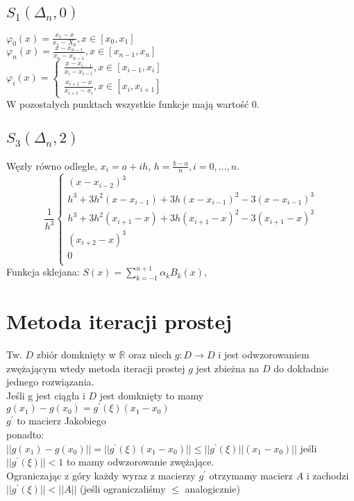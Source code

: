 \documentclass[twocolumn]{article}
\begin{document}
\begin{flushleft}
\subsection{$S_1(\Delta_n, 0)$}
$\varphi_0(x) = \frac{x_1-x}{x_1-X_0}, x \in [x_0, x_1]$\\
$\varphi_n(x) = \frac{x-x_{n-1}}{x_n - x_{n-1}}, x \in [x_{n-1}, x_n]$\\
$\varphi_i(x) =\begin{cases} \frac{x-x_{i-1}}{x_i - x_{i-1}}, x \in [x_{i-1}, x_i]\\ \frac{x_{i+1}-x}{x_{i+1} - x_i}, x \in [x_i, x_{i+1}]\end{cases}$ \\
W pozostałych punktach wszystkie funkcje mają wartość 0.\\
\subsection{$S_3(\Delta_n, 2)$}
Węzły równo odległe, $x_i = a+ih$, $h=\frac{b-a}{n}, i =0,...,n$.\\
$$
\frac{1}{h^3}\begin{cases}
(x - x_{i-2})^3 \\%
h^3 + 3h^2(x - x_{i-1}) + 3h(x - x_{i-1})^2 - 3(x - x_{i-1})^3 \\%
h^3 + 3h^2(x_{i+1} - x) + 3h(x_{i+1} - x)^2 - 3(x_{i+1} - x)^3\\%
(x_{i+2} - x)^3 \\%
0 \\%
\end{cases}
$$
Funkcja sklejana: $S(x) = \sum_{k=-1}^{n+1} \alpha_k B_k(x)$,
\section{Metoda iteracji prostej}
Tw. $D$ zbiór domknięty w $\mathbb{R}$ oraz niech $g:D\rightarrow D$ i jest odwzorowaniem zwężającym wtedy metoda iteracji prostej $g$ jest zbieżna na $D$ do dokładnie jednego rozwiązania.\\
Jeśli g jest ciągła i $D$ jest domknięty to mamy\\
$g(x_1) - g(x_0) = g^{\prime}(\xi)(x_1 - x_0)$\\
$g^{\prime}$ to macierz Jakobiego\\
ponadto:\\
$||g(x_1) - g(x_0)|| = ||g^{\prime}(\xi)(x_1 - x_0)|| \leq ||g^{\prime}(\xi)||(x_1 - x_0)||$
jeśli $||g^{\prime}(\xi)|| < 1$ to mamy odwzorowanie zwężające.\\
Ograniczając z góry każdy wyraz z macierzy $g^{\prime}$ otrzymamy macierz $A$ i zachodzi $||g^{\prime}(\xi)|| < ||A||$ (jeśli ograniczaliśmy $\leq$ analogicznie)
\end{flushleft}
\thispagestyle{empty}
\end{document}

